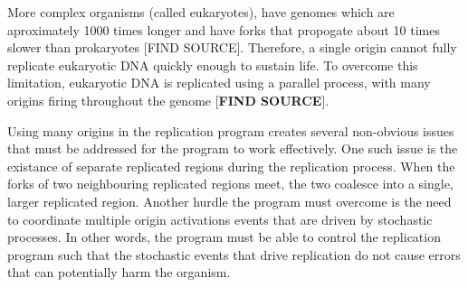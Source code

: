 \documentclass[serif]{sfuthesis}
\begin{document}
More complex organisms (called eukaryotes), have genomes which are aproximately 1000 times longer and have forks that propogate about 10 times slower than prokaryotes [FIND SOURCE].
Therefore, a single origin cannot fully replicate eukaryotic DNA quickly enough to sustain life.
To overcome this limitation, eukaryotic DNA is replicated using a parallel process, with many origins firing throughout the genome [\textbf{FIND SOURCE}].

Using many origins in the replication program creates several non-obvious issues that must be addressed for the program to work effectively.
One such issue is the existance of separate replicated regions during the replication process.
When the forks of two neighbouring replicated regions meet, the two coalesce into a single, larger replicated region.
Another hurdle the program must overcome is the need to coordinate multiple origin activations events that are driven by stochastic processes.
In other words, the program must be able to control the replication program such that the stochastic events that drive replication do not cause errors that can potentially harm the organism.\cite{eukaryotereview}



\end{document}

